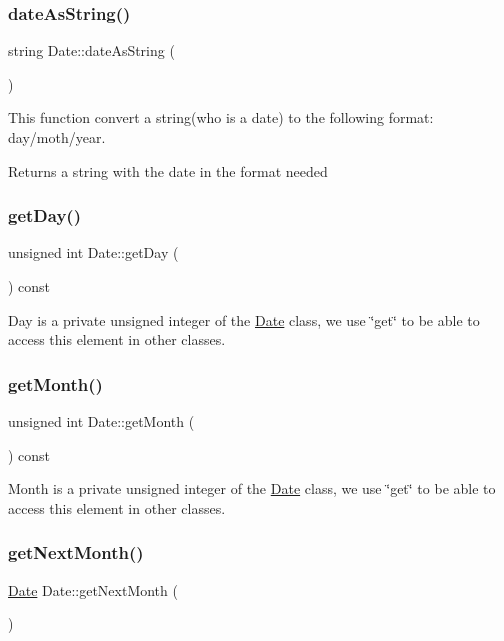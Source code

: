 \subsubsection{\texorpdfstring{date\+As\+String()}{dateAsString()}}
{\footnotesize\ttfamily string Date\+::date\+As\+String (\begin{DoxyParamCaption}{ }\end{DoxyParamCaption})}

This function convert a string(who is a date) to the following format\+: day/moth/year. \begin{DoxyReturn}{Returns}
a string with the date in the format needed 
\end{DoxyReturn}
\hypertarget{classDate_a13855b25efb79eaf7dccf08555421a1d}{}\label{classDate_a13855b25efb79eaf7dccf08555421a1d} 
\subsubsection{\texorpdfstring{get\+Day()}{getDay()}}
{\footnotesize\ttfamily unsigned int Date\+::get\+Day (\begin{DoxyParamCaption}{ }\end{DoxyParamCaption}) const}

Day is a private unsigned integer of the \hyperlink{classDate}{Date} class, we use \char`\"{}get\char`\"{} to be able to access this element in other classes. \hypertarget{classDate_a6152596dcf2e1e78e2095ea518de59e7}{}\label{classDate_a6152596dcf2e1e78e2095ea518de59e7} 
\subsubsection{\texorpdfstring{get\+Month()}{getMonth()}}
{\footnotesize\ttfamily unsigned int Date\+::get\+Month (\begin{DoxyParamCaption}{ }\end{DoxyParamCaption}) const}

Month is a private unsigned integer of the \hyperlink{classDate}{Date} class, we use \char`\"{}get\char`\"{} to be able to access this element in other classes. \hypertarget{classDate_a2a6e45e4a2de73d7ec7b9227442c4a3f}{}\label{classDate_a2a6e45e4a2de73d7ec7b9227442c4a3f} 
\subsubsection{\texorpdfstring{get\+Next\+Month()}{getNextMonth()}}
{\footnotesize\ttfamily \hyperlink{classDate}{Date} Date\+::get\+Next\+Month (\begin{DoxyParamCaption}{ }\end{DoxyParamCaption})}

